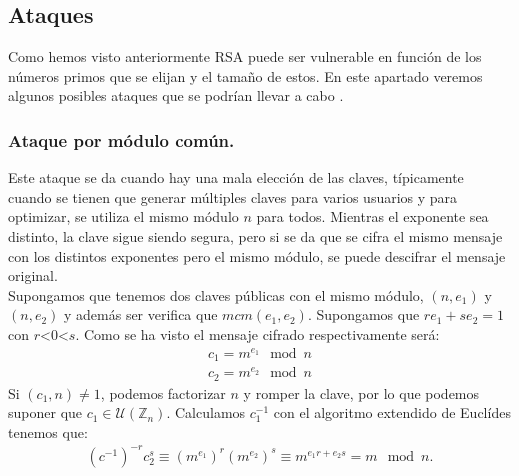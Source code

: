 \subsection{Ataques}
Como hemos visto anteriormente RSA puede ser vulnerable en función de los números primos que se elijan y el tamaño de estos. En este apartado veremos algunos posibles ataques que se podrían llevar a cabo \cite{apuntesCriptografia}.
	\subsubsection{Ataque por módulo común.}
	Este ataque se da cuando hay una mala elección de las claves, típicamente cuando se tienen que generar múltiples claves para varios usuarios y para optimizar, se utiliza el mismo módulo $n$ para todos. Mientras el exponente sea distinto, la clave sigue siendo segura, pero si se da que se cifra el mismo mensaje con los distintos exponentes pero el mismo módulo, se puede descifrar el mensaje original.\\
	Supongamos que tenemos dos claves públicas con el mismo módulo, $(n, e_1)$ y $(n, e_2)$ y además ser verifica que  $mcm(e_1,e_2)$. Supongamos que $re_1+se_2=1$ con $r$\textless $0$\textless $s$. Como se ha visto el mensaje cifrado respectivamente será:
	\begin{align*}
		c_1 = m^{e_1} \mod n\\
		c_2 = m^{e_2} \mod n
	\end{align*}
	Si $(c_1,n) \neq 1$, podemos factorizar $n$ y romper la clave, por lo que podemos suponer que $c_1 \in \mathcal{U}(\mathbb{Z}_n)$. Calculamos $c_1^{-1}$ con el algoritmo extendido de Euclídes tenemos que:
	\begin{align*}
			(c^{-1})^{-r}c_2^s \equiv (m^{e_1})^r(m^{e_2})^s \equiv m^{e_1r+e_2s} = m \mod n.
	\end{align*}

